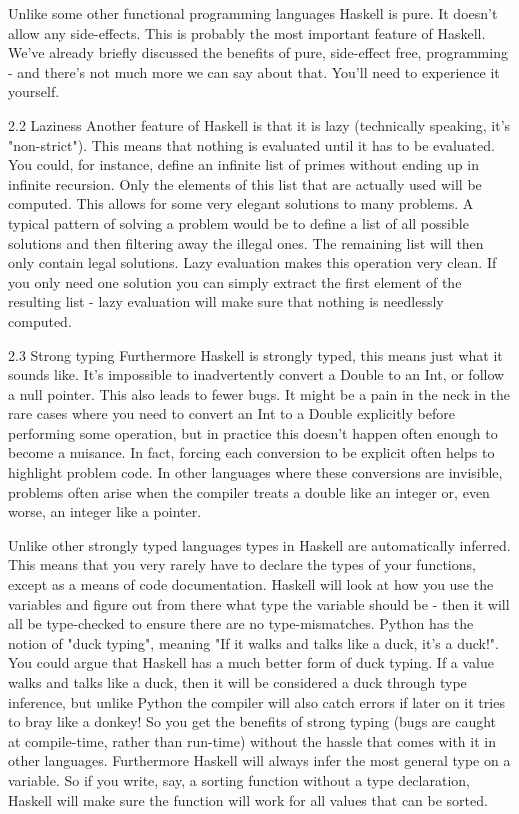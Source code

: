 \documentclass[main.tex]{subfiles}
\begin{document}
{{Unlike some other functional programming languages Haskell is pure. It doesn't allow any side-effects. This is probably the most important feature of Haskell. We've already briefly discussed the benefits of pure, side-effect free, programming - and there's not much more we can say about that. You'll need to experience it yourself.

2.2 Laziness
Another feature of Haskell is that it is lazy (technically speaking, it's "non-strict"). This means that nothing is evaluated until it has to be evaluated. You could, for instance, define an infinite list of primes without ending up in infinite recursion. Only the elements of this list that are actually used will be computed. This allows for some very elegant solutions to many problems. A typical pattern of solving a problem would be to define a list of all possible solutions and then filtering away the illegal ones. The remaining list will then only contain legal solutions. Lazy evaluation makes this operation very clean. If you only need one solution you can simply extract the first element of the resulting list - lazy evaluation will make sure that nothing is needlessly computed.

2.3 Strong typing
Furthermore Haskell is strongly typed, this means just what it sounds like. It's impossible to inadvertently convert a Double to an Int, or follow a null pointer. This also leads to fewer bugs. It might be a pain in the neck in the rare cases where you need to convert an Int to a Double explicitly before performing some operation, but in practice this doesn't happen often enough to become a nuisance. In fact, forcing each conversion to be explicit often helps to highlight problem code. In other languages where these conversions are invisible, problems often arise when the compiler treats a double like an integer or, even worse, an integer like a pointer.

Unlike other strongly typed languages types in Haskell are automatically inferred. This means that you very rarely have to declare the types of your functions, except as a means of code documentation. Haskell will look at how you use the variables and figure out from there what type the variable should be - then it will all be type-checked to ensure there are no type-mismatches. Python has the notion of "duck typing", meaning "If it walks and talks like a duck, it's a duck!". You could argue that Haskell has a much better form of duck typing. If a value walks and talks like a duck, then it will be considered a duck through type inference, but unlike Python the compiler will also catch errors if later on it tries to bray like a donkey! So you get the benefits of strong typing (bugs are caught at compile-time, rather than run-time) without the hassle that comes with it in other languages. Furthermore Haskell will always infer the most general type on a variable. So if you write, say, a sorting function without a type declaration, Haskell will make sure the function will work for all values that can be sorted.

}}
\end{document}
